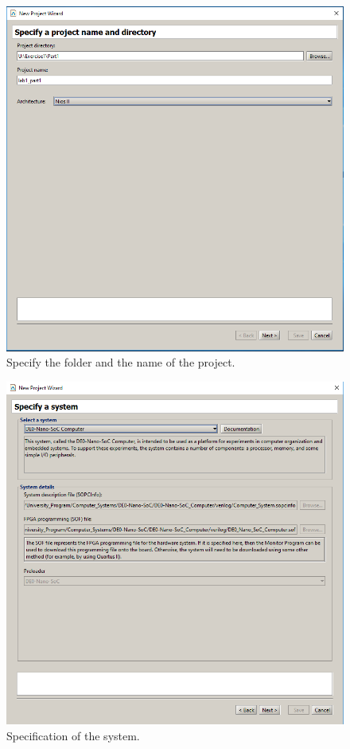 \documentclass[epsfig,10pt,fullpage]{article}
\begin{document}
\begin{enumerate}
\begin{figure}[H]
	\begin{center}
	\includegraphics[scale=0.58]{figures/figureMP2.png}
	\end{center}
	\caption{Specify the folder and the name of the project.}
\label{fig:MP2}
\end{figure}

\begin{figure}[H]
	\begin{center}
	\includegraphics[scale=0.58]{figures/figureMP3.png}
	\end{center}
	\caption{Specification of the system.}
\label{fig:MP3}
\end{figure}


\end{enumerate}
\end{document}
